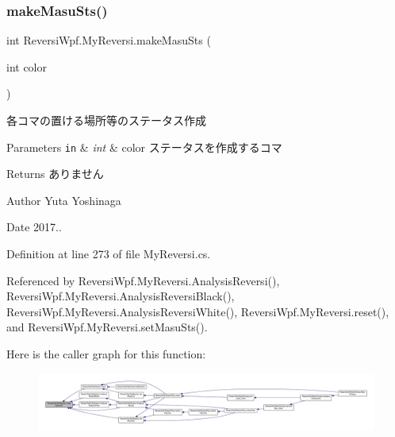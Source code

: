 \subsubsection{\texorpdfstring{make\+Masu\+Sts()}{makeMasuSts()}}
{\footnotesize\ttfamily int Reversi\+Wpf.\+My\+Reversi.\+make\+Masu\+Sts (\begin{DoxyParamCaption}\item[{int}]{color }\end{DoxyParamCaption})\hspace{0.3cm}{\ttfamily [private]}}



各コマの置ける場所等のステータス作成 


\begin{DoxyParams}[1]{Parameters}
\mbox{\tt in}  & {\em int} & color ステータスを作成するコマ \\
\hline
\end{DoxyParams}
\begin{DoxyReturn}{Returns}
ありません 
\end{DoxyReturn}
\begin{DoxyAuthor}{Author}
Yuta Yoshinaga 
\end{DoxyAuthor}
\begin{DoxyDate}{Date}
2017.. 
\end{DoxyDate}


Definition at line 273 of file My\+Reversi.\+cs.



Referenced by Reversi\+Wpf.\+My\+Reversi.\+Analysis\+Reversi(), Reversi\+Wpf.\+My\+Reversi.\+Analysis\+Reversi\+Black(), Reversi\+Wpf.\+My\+Reversi.\+Analysis\+Reversi\+White(), Reversi\+Wpf.\+My\+Reversi.\+reset(), and Reversi\+Wpf.\+My\+Reversi.\+set\+Masu\+Sts().

Here is the caller graph for this function\+:\nopagebreak
\begin{figure}[H]
\begin{center}
\leavevmode
\includegraphics[width=350pt]{class_reversi_wpf_1_1_my_reversi_a7e4d94600afb1b9d512341b1692769e7_icgraph}
\end{center}
\end{figure}
\mbox{\label{class_reversi_wpf_1_1_my_reversi_a61b1ee2e28cc4050ebbda2e54c7a60b6}} 
